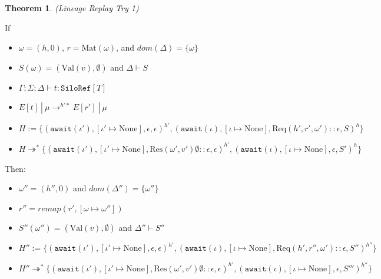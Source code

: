 \documentclass{article}
\theoremstyle{definition}
\newtheorem{thm}{Theorem}[section]
\newcommand{\Req}[3]{\text{Req}(#1, #2, #3)}
\newcommand{\Res}[2]{\text{Res}(#1, #2)}
\newcommand{\Val}[1]{\text{Val}(#1)}
\begin{document}
\newpage

\begin{thm}
\emph{(Lineage Replay Try 1)}\label{thm:replay-try1}

If
\begin{itemize}
\item $\omega = (h, 0)$, $r = \text{Mat}(\omega)$, and $dom(\Delta) = \{ \omega \}$
\item $S(\omega) = ({\Val v}, \emptyset)$ and $\Delta \vdash S$
\item $\Gamma; \Sigma ; \Delta \vdash t : \texttt{SiloRef}[T]$
\item $E[t] ~|~ \mu \rightarrow^{h'*} E[r'] ~|~ \mu$
\item $H := \{ (\texttt{await}(\iota'), [\iota' \mapsto \text{None}], \epsilon, \epsilon)^{h'}, (\texttt{await}(\iota), [\iota \mapsto \text{None}], {\Req {h'} {r'} {\omega'}} :: \epsilon, S)^h\}$
\item $H \twoheadrightarrow^* \{ (\texttt{await}(\iota'), [\iota' \mapsto \text{None}], {\Res {\omega'} {v'} \emptyset} :: \epsilon, \epsilon)^{h'}, (\texttt{await}(\iota), [\iota \mapsto \text{None}], \epsilon, S')^h\}$
\end{itemize}
Then:
\begin{itemize}
\item $\omega'' = (h'', 0)$ and $dom(\Delta'') = \{ \omega'' \}$
\item $r'' = remap(r', [\omega \mapsto \omega''])$
\item $S''(\omega'') = ({\Val v}, \emptyset)$ and $\Delta'' \vdash S''$
\item $H'' := \{ (\texttt{await}(\iota'), [\iota' \mapsto \text{None}], \epsilon, \epsilon)^{h'}, (\texttt{await}(\iota), [\iota \mapsto \text{None}], {\Req {h'} {r''} {\omega'}} :: \epsilon, S'')^{h''}\}$
\item $H'' \twoheadrightarrow^* \{ (\texttt{await}(\iota'), [\iota' \mapsto \text{None}], {\Res {\omega'} {v'} \emptyset} :: \epsilon, \epsilon)^{h'}, (\texttt{await}(\iota), [\iota \mapsto \text{None}], \epsilon, S''')^{h''}\}$

\end{itemize}
\end{thm}
\end{document}
